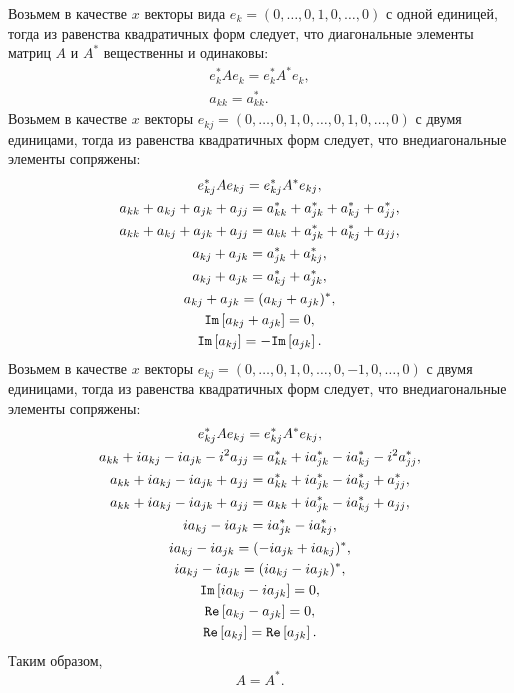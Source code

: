 Возьмем в качестве $x$ векторы вида $e_k = (0, \dots, 0, 1, 0, \dots, 0)$ с одной единицей, тогда из равенства квадратичных форм следует, что диагональные
элементы матриц $A$ и $A^*$ вещественны и одинаковы:
\begin{gather*}
    e_k^* A e_k = e_k^* A^* e_k , \\
    a_{kk} = a_{kk}^* .
\end{gather*}
Возьмем в качестве $x$ векторы $e_{kj} = (0, \dots, 0, 1, 0, \dots, 0, 1, 0, \dots, 0)$ с двумя единицами, тогда из равенства квадратичных форм следует,
что внедиагональные элементы сопряжены:
\begin{gather*}
    e_{kj}^* A e_{kj} = e_{kj}^* A^* e_{kj} , \\
    a_{kk} + a_{kj} + a_{jk} + a_{jj} = a_{kk}^* + a_{jk}^* + a_{kj}^* + a_{jj}^* , \\
    a_{kk} + a_{kj} + a_{jk} + a_{jj} = a_{kk} + a_{jk}^* + a_{kj}^* + a_{jj} , \\
    a_{kj} + a_{jk} = a_{jk}^* + a_{kj}^* , \\
    a_{kj} + a_{jk} = a_{kj}^* + a_{jk}^* , \\
    a_{kj} + a_{jk} = ( a_{kj} + a_{jk} )^* , \\
    \mathtt{Im} \left [ a_{kj} + a_{jk} \right ] = 0 , \\
    \mathtt{Im} \left [ a_{kj} \right ] = - \mathtt{Im} \left [ a_{jk} \right ] .
\end{gather*}
Возьмем в качестве $x$ векторы $e_{kj} = (0, \dots, 0, 1, 0, \dots, 0, -1, 0, \dots, 0)$ с двумя единицами, тогда из равенства квадратичных форм следует,
что внедиагональные элементы сопряжены:
\begin{gather*}
    e_{kj}^* A e_{kj} = e_{kj}^* A^* e_{kj} , \\
    a_{kk} + i a_{kj} - i a_{jk} - i^2 a_{jj} = a_{kk}^* + i a_{jk}^* - i a_{kj}^* - i^2 a_{jj}^* , \\
    a_{kk} + i a_{kj} - i a_{jk} + a_{jj} = a_{kk}^* + i a_{jk}^* - i a_{kj}^* + a_{jj}^* , \\
    a_{kk} + i a_{kj} - i a_{jk} + a_{jj} = a_{kk} + i a_{jk}^* - i a_{kj}^* + a_{jj} , \\
    i a_{kj} - i a_{jk} = i a_{jk}^* - i a_{kj}^* , \\
    i a_{kj} - i a_{jk} = ( - i a_{jk} + i a_{kj} )^* , \\
    i a_{kj} - i a_{jk} = ( i a_{kj} - i a_{jk})^* , \\
    \mathtt{Im} \left [ i a_{kj} - i a_{jk} \right ] = 0 , \\
    \mathtt{Re} \left [ a_{kj} - a_{jk} \right ] = 0 , \\
    \mathtt{Re} \left [ a_{kj} \right ] = \mathtt{Re} \left [ a_{jk} \right ] .
\end{gather*}
Таким образом,
\[
    A = A^*.
\]


